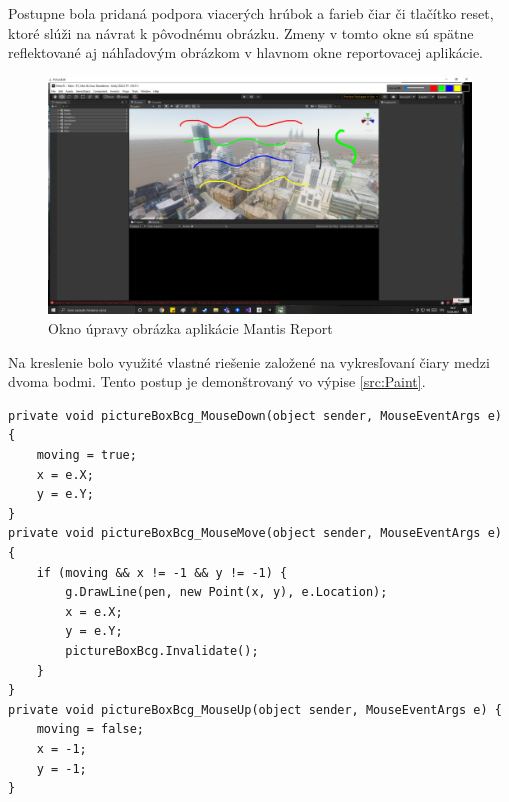 \documentclass[slovak, bachelorpractice]{diploma}
\begin{document}
Postupne bola pridaná podpora viacerých hrúbok a farieb čiar či tlačítko reset, ktoré slúži na návrat k pôvodnému obrázku. Zmeny v tomto okne sú spätne reflektované aj náhľadovým obrázkom v hlavnom okne reportovacej aplikácie. 
\begin{figure}[!htbp]
	\centering
	\includegraphics[width=1\textwidth]{Pictures/pictureEditBox.png}
	\caption{Okno úpravy obrázka aplikácie Mantis Report}
	\label{pic:Paint}
\end{figure}

Na kreslenie bolo využité vlastné riešenie založené na vykresľovaní čiary medzi dvoma bodmi. Tento postup je demonštrovaný vo výpise \ref{src:Paint}.
\vspace{10pt}
\begin{lstlisting}[label=src:Paint,caption={Implementácia kreslenia v prostredí Windows Forms}]
private void pictureBoxBcg_MouseDown(object sender, MouseEventArgs e) {
    moving = true;
    x = e.X;
    y = e.Y;
}
private void pictureBoxBcg_MouseMove(object sender, MouseEventArgs e) {
    if (moving && x != -1 && y != -1) {
        g.DrawLine(pen, new Point(x, y), e.Location);
        x = e.X;
        y = e.Y;
        pictureBoxBcg.Invalidate();
    }
}
private void pictureBoxBcg_MouseUp(object sender, MouseEventArgs e) {
    moving = false;
    x = -1;
    y = -1;
}
\end{lstlisting}
\end{document}
